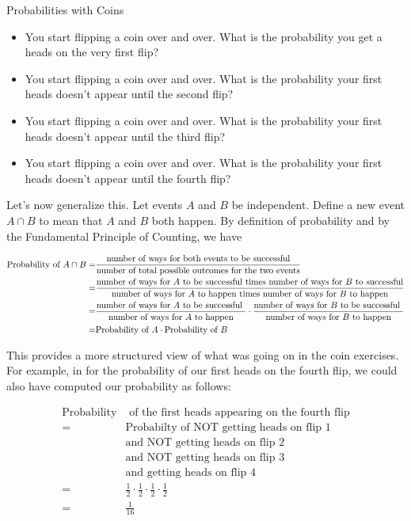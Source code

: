 \begin{exercise}{Probabilities with Coins \Coffeecup \Coffeecup}
 \begin{itemize}
 \item You start flipping a coin over and over. What is the probability you get a heads on the very first flip?
\vspace*{1in}
\item You start flipping a coin over and over. What is the probability your first heads doesn't appear until the second flip?
\vspace*{1in}
\item You start flipping a coin over and over. What is the probability your first heads doesn't appear until the third flip?
\vspace*{1in}
\item You start flipping a coin over and over. What is the probability your first heads doesn't appear until the fourth flip?
\vspace*{1in}
\end{itemize}
\end{exercise}

Let's now generalize this.  Let events $A$ and $B$ be independent.  Define a new event $A\cap B$ to mean that $A$ and $B$ both happen. By definition of probability and by the Fundamental Principle of Counting, we have 

\begin{align*}
\text{Probability of $A \cap B$}=& \frac{\text{number of ways for both events to be successful}}{\text{number of total possible outcomes for the two events}}\\
=& \frac{\text{number of ways for $A$ to be successful times number of ways for $B$ to successful}}{\text{number of ways for $A$ to happen times number of ways for $B$ to happen}}\\
=& \frac{\text{number of ways for $A$ to be successful }}{\text{number of ways for $A$ to happen}} \cdot \frac{\text{number of ways for $B$ to be successful }}{\text{number of ways for $B$ to happen}} \\
=&\text{Probability of $A$} \cdot \text{Probability of $ B$}
\end{align*}

This provides a more structured view of what was going on in the coin exercises.  For example, in for the probability of our first heads on the fourth flip, we could also have computed our probability as follows: 

\begin{align*}
\text{Probability} & \text{ of the first heads appearing on the fourth flip} \\ =& \text{Probabilty of NOT getting heads on flip 1} \\ &\text{and NOT getting heads on flip 2} \\ &\text{and NOT getting heads on flip 3} \\ &\text{and getting heads on flip 4}\\
=& \frac{1}{2}\cdot \frac{1}{2} \cdot \frac{1}{2} \cdot \frac{1}{2}\\
=& \frac{1}{16}
\end{align*}

